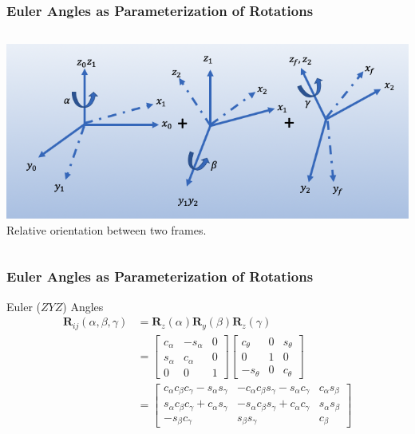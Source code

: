 \begin{frame}
	\frametitle{Euler Angles as Parameterization of Rotations}
	\begin{columns}[]
		\begin{column}{.95\linewidth}
			\centering
			\includegraphics[width=\columnwidth]{../Notes/figures/zyz.png}
			\footnotesize{Relative orientation between two frames.}
		\end{column}
	\end{columns}
\end{frame}

\begin{frame}
	\frametitle{Euler Angles as Parameterization of Rotations}
			\begin{block}{Euler ($ZYZ$) Angles}
				\begin{align}
					\bm{R}_{ij}(\alpha, \beta, \gamma) &= \bm{R}_z(\alpha) \bm{R}_y(\beta) \bm{R}_z(\gamma) \\
					& = \begin{bmatrix}
						c_\alpha & -s_\alpha & 0 \\
						s_\alpha & c_\alpha & 0 \\
						0 & 0 & 1
					\end{bmatrix}
					\begin{bmatrix}
						c_\theta  & 0 & s_\theta\\
						0  & 1 & 0 \\
						-s_\theta  & 0 & c_\theta 
					\end{bmatrix} \nonumber \\
					&= \begin{bmatrix}
						c_\alpha c_\beta c_\gamma - s_\alpha s_\gamma & -c_\alpha c_\beta s_\gamma - s_\alpha c_\gamma & c_\alpha s_\beta \\
						s_\alpha c_\beta c_\gamma + c_\alpha s_\gamma & -s_\alpha c_\beta s_\gamma + c_\alpha c_\gamma  & s_\alpha s_\beta \\
						-s_\beta c_\gamma & s_\beta s_\gamma & c_\beta
					\end{bmatrix} 
					\label{eq:zyz}
				\end{align} 
			\end{block}
\end{frame}

